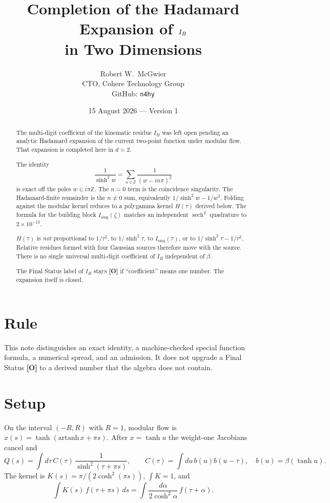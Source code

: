 \documentclass[11pt]{article}
\title{\textbf{Completion of the Hadamard Expansion of $\IB$\\
in Two Dimensions}}
\author{Robert W.\ McGwier\\
\small CTO, Cohere Technology Group\\
\small GitHub: \texttt{n4hy}}
\date{15 August 2026 --- Version 1}
\theoremstyle{definition}
\newcommand{\pO}{\textbf{[O]}}
\newcommand{\IB}{I_B}
\newcommand{\sech}{\operatorname{sech}}
\begin{document}
\maketitle

\begin{abstract}
\noindent
The multi-digit coefficient of the kinematic residue $\IB$ was left
open pending an analytic Hadamard expansion of the current two-point
function under modular flow. That expansion is completed here in
$d=2$.

The identity
\begin{equation*}
\frac{1}{\sinh^{2}w}
=
\sum_{n\in\mathbb{Z}}\frac{1}{(w-in\pi)^{2}}
\end{equation*}
is exact off the poles $w\in i\pi\mathbb{Z}$. The $n=0$ term is the
coincidence singularity. The Hadamard-finite remainder is the $n\neq 0$
sum, equivalently $1/\sinh^{2}w-1/w^{2}$. Folding against the modular
kernel reduces to a polygamma kernel $H(\tau)$ derived below.
The formula for the building block $I_{\mathrm{sing}}(\zeta)$ matches
an independent $\sech^{2}$ quadrature to $2\times 10^{-13}$.

$H(\tau)$ is \emph{not} proportional to $1/\tau^{2}$, to
$1/\sinh^{2}\tau$, to $I_{\mathrm{sing}}(\tau)$, or to
$1/\sinh^{2}\tau-1/\tau^{2}$. Relative residues formed with four
Gaussian sources therefore move with the source. There is no single
universal multi-digit coefficient of $\IB$ independent of $\beta$.

The Final Status label of $\IB$ stays \pO{} if ``coefficient'' means
one number. The expansion itself is closed.
\end{abstract}

\section*{Rule}
This note distinguishes an exact identity, a machine-checked special
function formula, a numerical spread, and an admission. It does not
upgrade a Final Status \pO{} to a derived number that the algebra
does not contain.

\section{Setup}

On the interval $(-R,R)$ with $R=1$, modular flow is
$x(s)=\tanh(\mathrm{artanh}\,x+\pi s)$. After $x=\tanh u$ the
weight-one Jacobians cancel \cite{McGwierVI,McGwier12} and
\begin{equation}
Q(s)
=
\int d\tau\,C(\tau)\,\frac{1}{\sinh^{2}(\tau+\pi s)},
\qquad
C(\tau)=\int du\,b(u)b(u-\tau),
\quad
b(u)=\beta(\tanh u).
\label{eq:Q}
\end{equation}
The kernel is $K(s)=\pi/(2\cosh^{2}(\pi s))$, $\int K=1$, and
\begin{equation}
\int K(s)\,f(\tau+\pi s)\,ds
=
\int\frac{d\alpha}{2\cosh^{2}\alpha}\,f(\tau+\alpha).
\label{eq:pull}
\end{equation}
\end{document}
